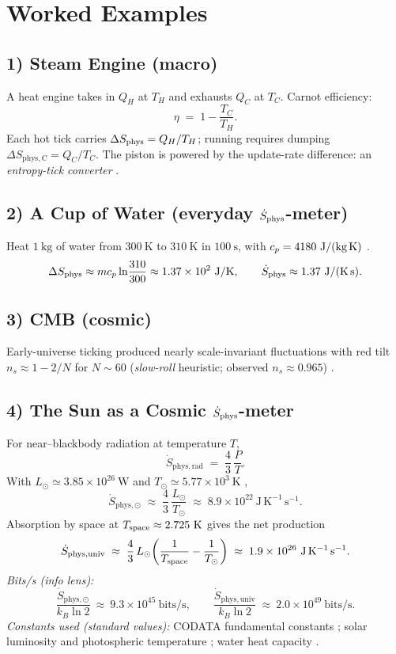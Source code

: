 \section*{Worked Examples}

\subsection*{1) Steam Engine (macro)}
A heat engine takes in \(Q_H\) at \(T_H\) and exhausts \(Q_C\) at \(T_C\).
Carnot efficiency:
\[
\eta \;=\; 1 - \frac{T_C}{T_H}.
\]
Each hot tick carries \(\Delta S_{\mathrm{phys}} = Q_H/T_H\); running requires dumping \(\Delta S_{\mathrm{phys,C}} = Q_C/T_C\).
The piston is powered by the update-rate difference: an \emph{entropy-tick converter} \cite{callen1985thermodynamics}.

\subsection*{2) A Cup of Water (everyday \(\dot{S}_{\mathrm{phys}}\)-meter)}
Heat \(1~\text{kg}\) of water from \(300\ \text{K}\) to \(310\ \text{K}\) in \(100\ \text{s}\), with \(c_p = 4180\ \text{J/(kg\,K)}\) \cite{crc_handbook}.
\[
\Delta S_{\mathrm{phys}} \approx m c_p \ln\!\frac{310}{300} \approx 1.37\times 10^{2}\ \text{J/K},\qquad
\dot{S}_{\mathrm{phys}} \approx 1.37 \ \text{J/(K\,s)}.
\]

\subsection*{3) CMB (cosmic)}
Early-universe ticking produced nearly scale-invariant fluctuations with red tilt
\(n_s \approx 1 - 2/N\) for \(N \sim 60\) (\emph{slow-roll} heuristic; observed \(n_s\!\approx\!0.965\)) \cite{peebles1993principles,planck2018params}.

\subsection*{4) The Sun as a Cosmic \(\dot{S}_{\mathrm{phys}}\)-meter}
For near–blackbody radiation at temperature \(T\),
\[
\dot{S}_{\mathrm{phys,rad}} \;=\; \frac{4}{3}\,\frac{P}{T}.
\]
With \(L_\odot \simeq 3.85\times 10^{26}\ \mathrm{W}\) and \(T_\odot \simeq 5.77\times 10^3\ \mathrm{K}\) \cite{allen2000},
\[
\dot{S}_{\mathrm{phys},\odot} \;\approx\; \frac{4}{3}\,\frac{L_\odot}{T_\odot}
\;\approx\; 8.9\times 10^{22}\ \mathrm{J\,K^{-1}\,s^{-1}}.
\]
Absorption by space at \(T_{\rm space}\approx 2.725\ \mathrm{K}\) \cite{planck2018params} gives the net production
\[
\dot{S}_{\mathrm{phys,univ}} \;\approx\; \frac{4}{3}\,L_\odot\!\left(\frac{1}{T_{\rm space}} - \frac{1}{T_\odot}\right)
\;\approx\; 1.9\times 10^{26}\ \mathrm{J\,K^{-1}\,s^{-1}}.
\]
\emph{Bits/s (info lens):}
\[
\frac{\dot{S}_{\mathrm{phys},\odot}}{k_B\ln 2}\ \approx\ 9.3\times 10^{45}\ \text{bits/s},\qquad
\frac{\dot{S}_{\mathrm{phys,univ}}}{k_B\ln 2}\ \approx\ 2.0\times 10^{49}\ \text{bits/s}.
\]
\footnotesize\noindent\emph{Constants used (standard values):} CODATA fundamental constants \cite{codata2018}; solar luminosity and photospheric temperature \cite{allen2000}; water heat capacity \cite{crc_handbook}.
\normalsize

